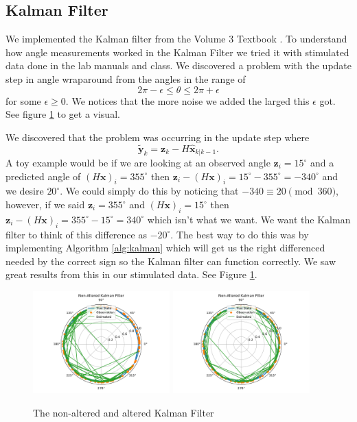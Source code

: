 \documentclass[11pt]{amsart}
\begin{document}
\subsection{Kalman Filter}
We implemented the Kalman filter from the Volume 3 Textbook \cite{V3}. To understand how angle measurements worked in the Kalman Filter we tried it with
stimulated data done in the lab manuals and class. We discovered a problem with the update step in angle wraparound from the angles in the range of 
\[2\pi - \epsilon \leq \theta \leq 2\pi + \epsilon\] for some $\epsilon \geq 0$. We notices that the more noise we added the larged this $\epsilon$ got. 
See figure \ref{fig:simple_kalman} to get a visual.

We discovered that the problem was occurring in the update step where \[\mathbf{\tilde{y}}_k = \mathbf{z}_k - H\mathbf{\hat{x}}_{k|k-1}.\]
A toy example would be if we are looking at an observed angle $\mathbf{z}_i = 15^{\circ}$ and a predicted angle of $(H\mathbf{x})_i = 355^{\circ}$ 
then $\mathbf{z}_i - (H\mathbf{x})_i = 15^{\circ} - 355^{\circ} = -340^{\circ}$ and we desire $20^{\circ}$. We could simply do this by noticing that $-340 \equiv 20 \pmod {360}$,
however, if we said $\mathbf{z}_i=355^{\circ}$ and $(H\mathbf{x})_i = 15^{\circ}$ then $\mathbf{z}_i - (H\mathbf{x})_i = 355^{\circ} - 15^{\circ} = 340^{\circ}$ which isn't what we want.
We want the Kalman filter to think of this difference as $-20^{\circ}$. The best way to do this was by implementing Algorithm \ref{alg:kalman} which will get us the right differenced needed by 
the correct sign so the Kalman filter can function correctly. We saw great results from this in our stimulated data. See Figure \ref{fig:simple_kalman}.

\begin{figure}[htp]
    \centering
    \includegraphics[width=0.47\textwidth]{non_altered_kalman.pdf}\hfill
    \includegraphics[width=0.47\textwidth]{altered_kalman.pdf}\hfill
    \caption{The non-altered and altered Kalman Filter}
    \label{fig:simple_kalman}
\end{figure}
\end{document}
